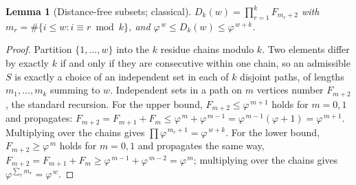 \documentclass[11pt]{amsart}
\newtheorem{lemma}[theorem]{Lemma}
\theoremstyle{definition}
\theoremstyle{remark}
\begin{document}
\begin{lemma}[Distance-free subsets; classical]
\label{lem:subsets}
$D_k(w) = \prod_{r=1}^{k} F_{m_r+2}$ with $m_r = \#\{i \le w : i \equiv r \bmod k\}$, and $\varphi^{\,w} \le D_k(w) \le \varphi^{\,w+k}$.
\end{lemma}

\begin{proof}
Partition $\{1,\dots,w\}$ into the $k$ residue chains modulo $k$. Two elements differ by exactly $k$ if and only if they are consecutive within one chain, so an admissible $S$ is exactly a choice of an independent set in each of $k$ disjoint paths, of lengths $m_1,\dots,m_k$ summing to $w$. Independent sets in a path on $m$ vertices number $F_{m+2}$, the standard recursion. For the upper bound, $F_{m+2} \le \varphi^{\,m+1}$ holds for $m = 0, 1$ and propagates: $F_{m+2} = F_{m+1} + F_m \le \varphi^{\,m} + \varphi^{\,m-1} = \varphi^{\,m-1}(\varphi+1) = \varphi^{\,m+1}$. Multiplying over the chains gives $\prod \varphi^{\,m_r+1} = \varphi^{\,w+k}$. For the lower bound, $F_{m+2} \ge \varphi^{\,m}$ holds for $m = 0,1$ and propagates the same way, $F_{m+2} = F_{m+1}+F_m \ge \varphi^{\,m-1}+\varphi^{\,m-2} = \varphi^{\,m}$; multiplying over the chains gives $\varphi^{\sum_r m_r} = \varphi^{\,w}$.
\end{proof}
\end{document}
